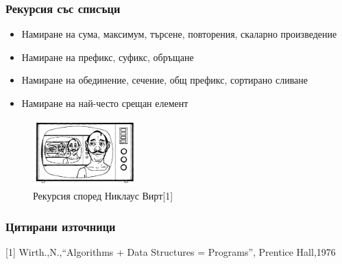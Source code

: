 \documentclass{beamer}
\begin{document}
\begin{frame}[fragile]
  \frametitle{Рекурсия със списъци}


  \begin{itemize}
    \item Намиране на сума, максимум, търсене, повторения, скаларно произведение
    \item Намиране на префикс, суфикс, обръщане
    \item Намиране на обединение, сечение, общ префикс, сортирано сливане
    \item Намиране на най-често срещан елемент
  \end{itemize}  

\begin{center}
  \begin{figure}
    \includegraphics[width=4.0cm]{images/rec_wirt}  
    \caption{Рекурсия според Никлаус Вирт[1]}
  \end{figure}
  
\end{center}
\end{frame}




\begin{frame}[fragile]
  \frametitle{Цитирани източници}

    [1] Wirth.,N.,``Algorithms + Data Structures = Programs'', Prentice Hall,1976
\end{frame}


\end{document}
